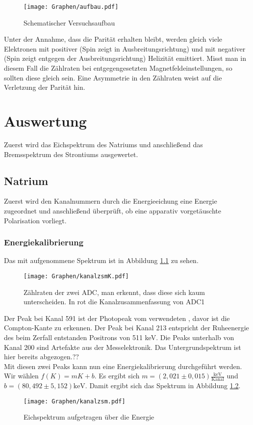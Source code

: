 \documentclass[twoside,colorback,accentcolor=tud4c,11pt]{tudreport}
\begin{document}
  
\begin{figure}[H]
\centering
   	\begin{minipage}[b]{1\textwidth}
   	\texttt{[image: Graphen/aufbau.pdf]}
   	\caption{Schematischer Versuchsaufbau}
  	\label{Aa}
   	\end{minipage}
\end{figure}  


Unter der Annahme, dass die Parität erhalten bleibt, werden gleich viele Elektronen mit positiver (Spin zeigt in Ausbreitungsrichtung) und mit negativer (Spin zeigt entgegen der Ausbreitungsrichtung) Helizität emittiert. Misst man in diesem Fall die Zählraten bei entgegengesetzten Magnetfeldeinstellungen, so sollten diese gleich sein. Eine Asymmetrie in den Zählraten weist auf die Verletzung der Parität hin. 
     	     	
\chapter{Auswertung}
Zuerst wird das Eichspektrum des Natriums und anschließend das Bremsspektrum des Strontiums ausgewertet.
\section{Natrium}
Zuerst wird den Kanalnummern durch die Energieeichung eine Energie zugeordnet und anschließend überprüft, ob eine apparativ vorgetäuschte Polarisation vorliegt.
\subsection{Energiekalibrierung}
Das mit  aufgenommene Spektrum ist in Abbildung \ref{fig:kanalK} zu sehen.
\begin{figure}[H]
\centering
   	\begin{minipage}[b]{\textwidth}
   	\texttt{[image: Graphen/kanalzsmK.pdf]}
   	\caption{Zählraten der zwei ADC, man erkennt, dass diese sich kaum unterscheiden. In rot die Kanalzusammenfassung von ADC1}
  	\label{fig:kanalK}
   	\end{minipage}
\end{figure}
Der Peak bei Kanal 591 ist der Photopeak vom verwendeten , davor ist die Compton-Kante zu erkennen. Der Peak bei Kanal 213 entspricht der Ruheenergie des beim Zerfall entstanden Positrons von 511 keV. Die Peaks unterhalb von Kanal 200 sind Artefakte aus der Messelektronik. Das Untergrundspektrum ist hier bereits abgezogen.??\\
Mit diesen zwei Peaks kann nun eine Energiekalibrierung durchgeführt werden. Wir wählen $ f(K)=mK+b $. Es ergibt sich $ m=(2,021\pm0,015)\frac{\text{keV}}{\text{Kanal}} $ und $ b=(80,492\pm5,152) \text{keV}$. Damit ergibt sich das Spektrum in Abbildung \ref{fig:kanal}.
\begin{figure}[H]
\centering
   	\begin{minipage}[b]{\textwidth}
   	\texttt{[image: Graphen/kanalzsm.pdf]}
   	\caption{Eichspektrum aufgetragen über die Energie}
  	\label{fig:kanal}
   	\end{minipage}
\end{figure}
\end{document}
